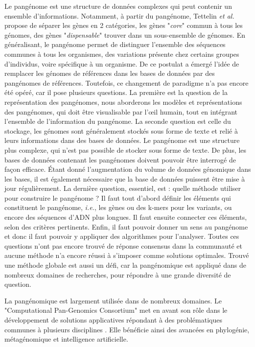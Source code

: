 Le pangénome est une structure de données complexes qui peut contenir un ensemble d'informations. Notamment, à partir du pangénome, Tettelin \textit{et al.} propose de séparer les gènes en 2 catégories, les gènes "\textit{core}" commun à tous les génomes, des gènes "\textit{dispensable}" trouver dans un sous-ensemble de génomes. En généralisant, le pangénome permet de distinguer l'ensemble des séquences communes à tous les organismes, des variations présente chez certains groupes d'individus, voire spécifique à un organisme. De ce postulat a émergé l'idée de remplacer les génomes de références dans les bases de données par des pangénomes de références. Toutefois, ce changement de paradigme n'a pas encore été opéré, car il pose plusieurs questions. La première est la question de la représentation des pangénomes, nous aborderons les modèles et représentations des pangénomes, qui doit être visualisable par l'\oe il humain, tout en intégrant l'ensemble de l'information du pangénome. La seconde question est celle du stockage, les génomes sont généralement stockés sous forme de texte et relié à leurs informations dans des bases de données. Le pangénome est une structure plus complexe, qui n'est pas possible de stocker sous forme de texte. De plus, les bases de données contenant les pangénomes doivent pouvoir être interrogé de façon efficace. Étant donné l'augmentation du volume de données génomique dans les bases, il est également nécessaire que la base de données puissent être mise à jour régulièrement. La dernière question, essentiel, est : quelle méthode utiliser pour construire le pangénome ? Il faut tout d'abord définir les éléments qui constituent le pangénome, \textit{i.e.}, les gènes ou des k-mers pour les variants, ou encore des séquences d'ADN plus longues. Il faut ensuite connecter ces éléments, selon des critères pertinents. Enfin, il faut pouvoir donner un sens au pangénome et donc il faut pouvoir y appliquer des algorithmes pour l'analyser. Toutes ces questions n'ont pas encore trouvé de réponse consensus dans la communauté et aucune méthode n'a encore réussi à s'imposer comme solutions optimales. Trouvé une méthode globale est aussi un défi, car la pangénomique est appliqué dans de nombreux domaines de recherches, pour répondre à une grande diversité de question.

La pangénomique est largement utilisée dans de nombreux domaines. Le "Computational Pan-Genomics Consortium" met en avant son rôle dans le développement de solutions applicatives répondant à des problématiques communes à plusieurs disciplines \cite{the_computational_pan-genomics_consortium_computational_2018}. Elle bénéficie ainsi des avancées en phylogénie, métagénomique et intelligence artificielle.

